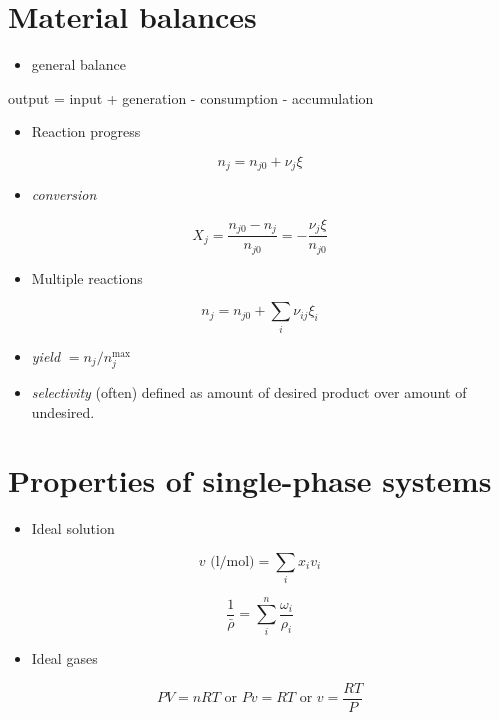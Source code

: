 \documentclass[11pt]{article}
\begin{document}
\section{Material balances}
\label{sec-3}
\begin{itemize}
\item general balance
\end{itemize}
\begin{framed}
output = input + generation - consumption - accumulation
\end{framed}

\begin{itemize}
\item Reaction progress
\end{itemize}
\begin{equation*}
n_{j} = n_{j0} + \nu_{j} \xi
\end{equation*}

\begin{itemize}
\item \emph{conversion}
\end{itemize}

\[X_{j} = \frac{n_{j0}-n_{j}}{n_{j0}} = -\frac{\nu_{j}\xi}{n_{j0}} \]

\begin{itemize}
\item Multiple reactions
\end{itemize}

\[ n_{j} = n_{j0} + \sum_{i} \nu_{ij} \xi_{i} \]

\begin{itemize}
\item \emph{yield} \(=n_{j}/n_{j}^{\text{max}}\)

\item \emph{selectivity} (often) defined as amount of desired product over amount of
undesired.
\end{itemize}

\section{Properties of single-phase systems}
\label{sec-4}
\begin{itemize}
\item Ideal solution
\end{itemize}
\[ v \text{ (l/mol)} = \sum_{i} x_{i} v_{i} \]

\[ \frac{1}{\bar{\rho}} = \sum_{i}^{n} \frac{\omega_{i}}{\rho_{i}} \]

\begin{itemize}
\item Ideal gases
\end{itemize}
\[ P V = n R T \text{ or } P v = R T \text{ or } v = \frac{RT}{P} \]
\end{document}
